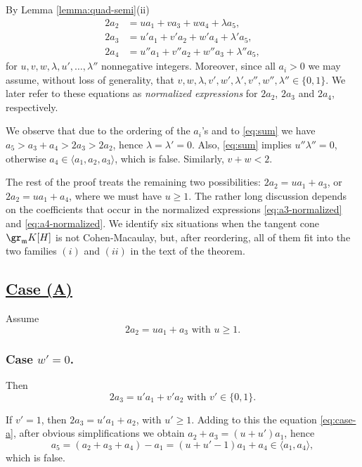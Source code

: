 \documentclass[12pt]{amsart}
\def\frk{\mathfrak}               %
\def\mm{{\frk m}}
\begin{document}
By Lemma \ref{lemma:quad-semi}(ii) 
\begin{align}
2a_2  &= u a_1+ v a_3 +  w a_4 +\lambda a_5, \label{eq:a2-normalized} \\ 
2a_3  &= u' a_1+ v' a_2 +  w' a_4 +\lambda' a_5, \label{eq:a3-normalized} \\
2a_4  &= u'' a_1+ v'' a_2 +  w'' a_3 +\lambda'' a_5, \label{eq:a4-normalized}
\end{align}
 for  $u, v, w, \lambda, u', \dots, \lambda''$  nonnegative integers. Moreover, since all $a_i>0$  we may assume, without loss of generality, that
$v,w, \lambda, v',w', \lambda', v'', w'', \lambda'' \in \{0,1\}$. We later refer to these equations as {\em normalized expressions} for $2a_2$, $2a_3$ and $2a_4$, respectively. 

 
We observe that due to the  ordering of the $a_i$'s and to \eqref{eq:sum} we have $a_5>a_3+a_4>2 a_3>2a_2$, hence $\lambda=\lambda'=0$.
Also, \eqref{eq:sum} implies $u''\lambda''=0$, otherwise $a_4 \in \langle a_1, a_2, a_3\rangle$, which is false. Similarly,  $v+w <2$.

The rest of the proof treats the remaining two possibilities: $2 a_2= u a_1 + a_3$, or $2 a_2= u a_1 + a_4$, where we must have $u \geq 1$.
The rather long discussion depends on the coefficients that occur in the normalized expressions \eqref{eq:a3-normalized} and \eqref{eq:a4-normalized}.
We identify six situations  when the tangent cone $\gr_\mm K[H]$ is not Cohen-Macaulay, but, after  reordering, all of them fit into the two families 
$(i)$ and $(ii)$ in  the text of the theorem.
 
\medskip
   
\subsection{\underline{ Case (A)}} Assume 
\begin{equation}
\label{eq:case-a}
2 a_2= u a_1 + a_3 \text{ with }u \geq 1.
\end{equation}

\subsubsection{Case \underline{$w' =0$}.}
			Then  
			\begin{equation}
			2 a_3= u' a_1 + v' a_2 \text{ with } v' \in \{0, 1\}.
			\end{equation}
			 
			If $v'=1$, then $2 a_3= u' a_1+ a_2$, with $u' \geq 1$. Adding to this the equation \eqref{eq:case-a}, after obvious simplifications we obtain 
			$a_2+a_3= (u+u')a_1$, hence 
			$$
			 a_5=(a_2+a_3+a_4)-a_1= (u+u'-1) a_1+a_4 \in \langle a_1, a_4\rangle,
			$$ which is false.
			
\end{document}
